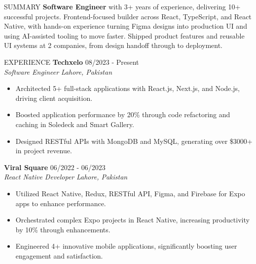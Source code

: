 \documentclass{resume}
\begin{document}
\begin{rSection}{SUMMARY}
\textbf{Software Engineer} with 3+ years of experience, delivering 10+ successful projects. Frontend-focused builder across React, TypeScript, and React Native, with hands-on experience turning Figma designs into production UI and using AI-assisted tooling to move faster. Shipped product features and reusable UI systems at 2 companies, from design handoff through to deployment.
\end{rSection}
\begin{rSection}{EXPERIENCE}
\textbf{Techxelo} \hfill 08/2023 - Present \\
\textit{Software Engineer}  \hfill \textit{Lahore, Pakistan}
\begin{itemize}
\itemsep -3pt {}
\item Architected 5+ full-stack applications with React.js, Next.js, and Node.js, driving client acquisition.
\item Boosted application performance by 20\% through code refactoring and caching in Soledeck and Smart Gallery.
\item Designed RESTful APIs with MongoDB and MySQL, generating over \$3000+ in project revenue.
\end{itemize}
\textbf{Viral Square} \hfill 06/2022 - 06/2023 \\
\textit{React Native Developer} \hfill \textit{Lahore, Pakistan}
\begin{itemize}
\itemsep -3pt {}
\item Utilized React Native, Redux, RESTful API, Figma, and Firebase for Expo apps to enhance performance.
\item Orchestrated complex Expo projects in React Native, increasing productivity by 10\% through enhancements.
\item Engineered 4+ innovative mobile applications, significantly boosting user engagement and satisfaction.
\end{itemize}
\end{rSection}
\end{document}
